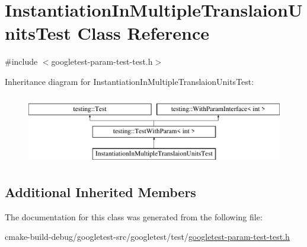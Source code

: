 \hypertarget{classInstantiationInMultipleTranslaionUnitsTest}{}\section{Instantiation\+In\+Multiple\+Translaion\+Units\+Test Class Reference}
\label{classInstantiationInMultipleTranslaionUnitsTest}


{\ttfamily \#include $<$googletest-\/param-\/test-\/test.\+h$>$}

Inheritance diagram for Instantiation\+In\+Multiple\+Translaion\+Units\+Test\+:\begin{figure}[H]
\begin{center}
\leavevmode
\includegraphics[height=3.000000cm]{classInstantiationInMultipleTranslaionUnitsTest}
\end{center}
\end{figure}
\subsection*{Additional Inherited Members}


The documentation for this class was generated from the following file\+:\begin{DoxyCompactItemize}
\item 
cmake-\/build-\/debug/googletest-\/src/googletest/test/\mbox{\hyperlink{googletest-param-test-test_8h}{googletest-\/param-\/test-\/test.\+h}}\end{DoxyCompactItemize}
